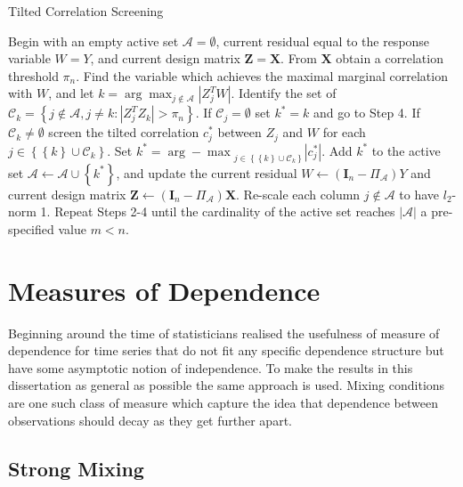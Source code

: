 \documentclass[11pt]{report}\usepackage[utf8]{inputenc}
\begin{document}
\begin{algorithm} 
\caption{Tilted Correlation Screening}
\begin{algorithmic}[1] \label{tilting algorithm}
  \scriptsize
  \STATE Begin with an empty active set $\mathcal{A} = \emptyset$, current residual equal to the response variable $W=Y$, and current design matrix $\boldsymbol{Z = X}$. From $\boldsymbol{X}$ obtain a correlation threshold $\pi_n$. 
  \STATE Find the variable which achieves the maximal marginal correlation with $W$, and let $k = \arg \max_{j \notin \mathcal{A}}\left | Z_j^TW \right |$. Identify the set of $\mathcal{C}_k = \left \{ j \notin \mathcal{A}, j \neq k : \left | Z_j^TZ_k \right | > \pi_n \right \}$. If $\mathcal{C}_j = \emptyset$ set $k^* = k$ and go to Step 4. 
  \STATE If $\mathcal{C}_k \neq \emptyset$ screen the tilted correlation $c_j^*$ between $Z_j$ and $W$ for each $j \in \left \{ \left \{ k \right \} \cup \mathcal{C}_k \right \}$. Set $k^* = {\arg-\max}_{j \in \left \{ \left \{ k \right \} \cup \mathcal{C}_k \right \}} \left | c_j^* \right |$. 
  \STATE Add $k^*$ to the active set $\mathcal{A} \leftarrow \mathcal{A} \cup\left \{ k^* \right \}$, and update the current residual $W \leftarrow \left ( \boldsymbol{I}_n-\Pi_\mathcal{A} \right )Y$ and current design matrix $\boldsymbol{Z} \leftarrow \left ( \boldsymbol{I}_n-\Pi_\mathcal{A} \right )\boldsymbol{X}$. Re-scale each column $j \notin \mathcal{A}$ to have $l_2$-norm 1. 
  \STATE Repeat Steps 2-4 until the cardinality of the active set reaches $\left | \mathcal{A} \right |$ a pre-specified value $m<n$. 
\end{algorithmic}
\end{algorithm}

\section{Measures of Dependence}\label{measures of dependence}

Beginning around the time of \cite{rosenblatt1956central} statisticians realised the usefulness of measure of dependence for time series that do not fit any specific dependence structure but have some asymptotic notion of independence. To make the results in this dissertation as general as possible the same approach is used. Mixing conditions are one such class of measure which capture the idea that dependence between observations should decay as they get further apart. 

\subsection{Strong Mixing}
\end{document}

